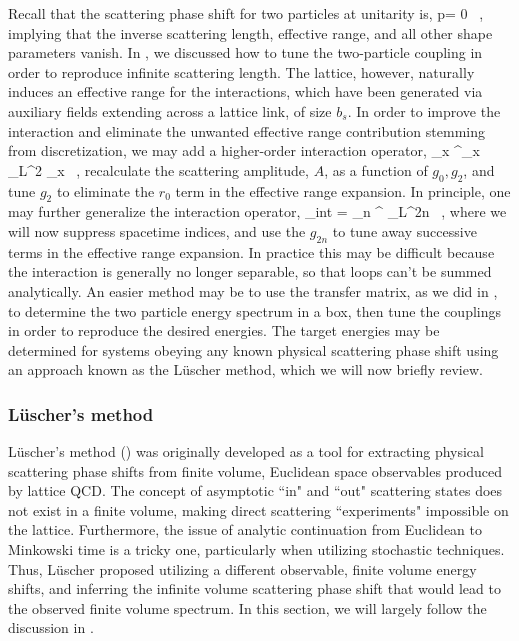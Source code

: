 Recall that the scattering phase shift for two particles at unitarity is,
\beq
p\cot\delta = 0 \ , 
\eeq
implying that the inverse scattering length, effective range, and all other shape parameters vanish. In , we discussed how to tune the two-particle coupling in order to reproduce infinite scattering length. The lattice, however, naturally induces an effective range for the interactions, which have been generated via auxiliary fields extending across a lattice link, of size $b_s$. In order to improve the interaction and eliminate the unwanted effective range contribution stemming from discretization, we may add a higher-order interaction operator,
\beq
\sum_{{\mathbf x}} \phi \psi^{\dagger}_{{\mathbf x}} \nabla_L^2 \psi_{{\mathbf x}} \ ,
\eeq
recalculate the scattering amplitude, $A$, as a function of $g_0, g_2$, and tune $g_2$ to eliminate the $r_0$ term in the effective range expansion. In principle, one may further generalize the interaction operator,
\beq
{}_{\mbox{\tiny int}} = \sum_n   \phi \psi^{\dagger} \nabla_L^{2n} \psi \ ,
\eeq
where we will now suppress spacetime indices, and use the $g_{2n}$ to tune away successive terms in the effective range expansion. In practice this may be difficult because the interaction is generally no longer separable, so that loops can't be summed analytically. An easier method may be to use the transfer matrix, as we did in , to determine the two particle energy spectrum in a box, then tune the couplings in order to reproduce the desired energies. The target energies may be determined for systems obeying any known physical scattering phase shift using an approach known as the L\"uscher method, which we will now briefly review.

\subsubsection{\label{sec:Luscher}L\"uscher's method}

L\"uscher's method (\cite{Luscher:1986pf,Luscher:1990ux}) was originally developed as a tool for extracting physical scattering phase shifts from finite volume, Euclidean space observables produced by lattice QCD. The concept of asymptotic ``in" and ``out" scattering states does not exist in a finite volume, making direct scattering ``experiments" impossible on the lattice. Furthermore, the issue of analytic continuation from Euclidean to Minkowski time is a tricky one, particularly when utilizing stochastic techniques. Thus, L\"uscher proposed utilizing a different observable, finite volume energy shifts, and inferring the infinite volume scattering phase shift that would lead to the observed finite volume spectrum. In this section, we will largely follow the discussion in \cite{Beane:2003da}.

